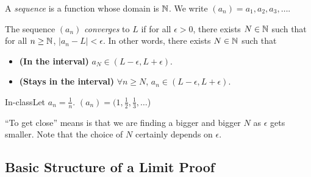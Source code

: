 \begin{definition}
    A \textit{sequence} is a function whose domain is $\mathbb{N}$. We write $(a_n) = a_1,a_2,a_3,\dots$.
\end{definition}
\setcounter{BoxCounter}{2}
\begin{definition}
    The sequence $(a_n)$ \textit{converges} to $L$ if for all $\epsilon > 0$, there exists $N \in \mathbb{N}$ such that for all $n \geq \mathbb{N}$, $|a_n - L| < \epsilon$. In other words, there exists $N \in \mathbb{N}$ such that
    \begin{itemize}
        \item \textbf{(In the interval)} $a_N \in (L - \epsilon, L + \epsilon)$.
        \item \textbf{(Stays in the interval)} $\forall n \geq N$, $a_n \in (L - \epsilon, L + \epsilon)$.
    \end{itemize}
\end{definition}

\begin{example}
    {In-class}Let $a_n = \frac{1}{n}$. $(a_n) = (1,\frac{1}{2},\frac{1}{3},\dots$)
\end{example}


``To get close'' means is that we are finding a bigger and bigger $N$ as $\epsilon$ gets smaller. Note that the choice of $N$ certainly depends on $\epsilon$.

\subsection{Basic Structure of a Limit Proof}

